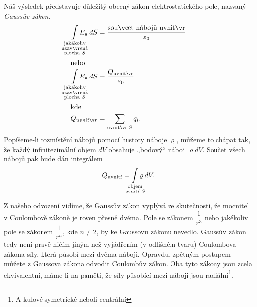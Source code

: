 {    Náš výsledek představuje důležitý obecný zákon elektrostatického pole, nazvaný \emph{Gaussův zákon}.
    \begin{align}
      \limitint_{\mathclap{\substack{\text{jakákoliv}      \\
                                     \text{uzavřená}       \\
                                     \text{plocha }S}}} E_n\dd{S} 
              &= \frac{\text{součet nábojů uvnitř}}{\varepsilon_0} \label{fyz:fey_eq_elstat34} \\
      \shortintertext{nebo}        
      \limitint_{\mathclap{\substack{\text{jakákoliv}       \\
                                            \text{uzavřená} \\
                                            \text{plocha }S}}} E_n\dd{S}
              &= \frac{Q_{\text{uvnitř}}}{\varepsilon_0}           \label{fyz:fey_eq_elstat35} \\
      \shortintertext{kde}
      Q_{uvnitř} 
              &= \sum\limits_{\text{uvnitř }S}q_i.                 \label{fyz:fey_eq_elstat36}  
    \end{align}
    Popíšeme-li rozmístění nábojů pomocí hustoty náboje \(\varrho\), můžeme to chápat tak, že každý 
    infinitezimální objem \(dV\) obsahuje „bodový“ náboj \(\varrho dV\). Součet všech nábojů pak 
    bude dán integrálem
    \begin{equation}\label{fyz:fey_eq_elstat37}
     Q_{\text{uvnitř}} = \limitint_{\mathclap{\substack{\text{objem}\\
                                                 \text{uvnitř }S}}} \varrho\dd{V}.
    \end{equation}
    
    Z našeho odvození vidíme, že Gaussův zákon vyplývá ze skutečnosti, že mocnitel v Coulombově 
    zákoně je roven přesně dvěma. Pole se zákonem \(\dfrac{1}{r^3}\) nebo jakékoliv pole se zákonem 
    \(\dfrac{1}{r^n}\), kde \(n\neq2\), by ke Gaussovu zákonu nevedlo. Gaussův zákon tedy není 
    právě ničím jiným než vyjádřením (v odlišném tvaru) Coulombova zákona síly, která působí mezi 
    dvěma náboji. Opravdu, zpětným postupem můžete z Gaussova zákona odvodit Coulombův zákon. Oba 
    tyto zákony jsou zcela ekvivalentní, máme-li na paměti, že síly působící mezi náboji jsou 
    radiální\footnote{A kulové symetrické neboli centrální}.
    
}
